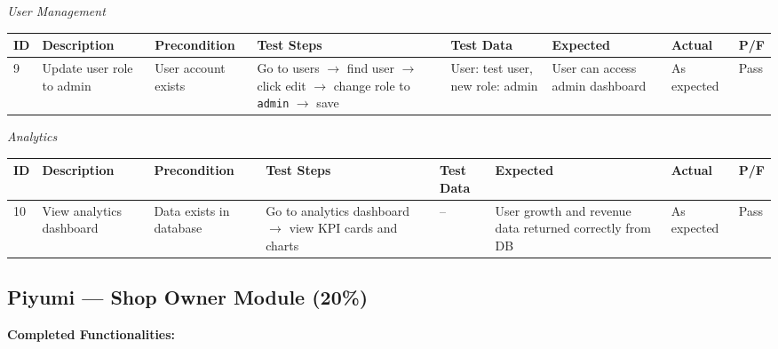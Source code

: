 \documentclass[12pt,a4paper]{report}
\begin{document}
\textit{User Management}

\begin{center}
\footnotesize
\begin{longtable}{p{0.4cm} p{2.2cm} p{1.8cm} p{3.2cm} p{2.2cm} p{2.2cm} p{1.4cm} p{0.8cm}}
\toprule
\textbf{ID} & \textbf{Description} & \textbf{Precondition} & \textbf{Test Steps} & \textbf{Test Data} & \textbf{Expected} & \textbf{Actual} & \textbf{P/F}\\
\midrule
\endhead
9 & Update user role to admin & User account exists & Go to users $\to$ find user $\to$ click edit $\to$ change role to \texttt{admin} $\to$ save & User: test user, new role: admin & User can access admin dashboard & As expected & Pass\\
\bottomrule
\end{longtable}
\end{center}

\textit{Analytics}

\begin{center}
\footnotesize
\begin{longtable}{p{0.4cm} p{2.2cm} p{1.8cm} p{3.2cm} p{2.2cm} p{2.2cm} p{1.4cm} p{0.8cm}}
\toprule
\textbf{ID} & \textbf{Description} & \textbf{Precondition} & \textbf{Test Steps} & \textbf{Test Data} & \textbf{Expected} & \textbf{Actual} & \textbf{P/F}\\
\midrule
\endhead
10 & View analytics dashboard & Data exists in database & Go to analytics dashboard $\to$ view KPI cards and charts & -- & User growth and revenue data returned correctly from DB & As expected & Pass\\
\bottomrule
\end{longtable}
\end{center}

\subsection{Piyumi --- Shop Owner Module (20\%)}

\textbf{Completed Functionalities:}
\end{document}

